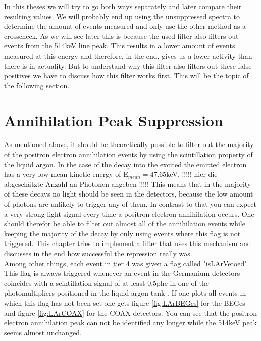 In this theses we will try to go both ways separately and later compare their resulting values.
We will probably end up using the unsuppressed spectra to determine the amount of events measured and only use the other method as a crosscheck.
As we will see later this is because the used filter also filters out events from the 514keV line peak.
This results in a lower amount of events measured at this energy and therefore, in the end, gives us a lower activity than there is in actuality. 
But to understand why this filter also filters out these false positives we have to discuss how this filter works first.
This will be the topic of the following section.
\\

\section{Annihilation Peak Suppression}
\label{sec:APS}

As mentioned above, it should be theoretically possible to filter out the majority of the positron electron annihilation events by using the scintillation property of the liquid argon.
In the case of the \Kr decay into the excited  the emitted electron has a very low mean kinetic energy of E\(_{mean}=47.65\)keV.
!!!!! hier die abgeschätzte Anzahl an Photonen angeben !!!!!
This means that in the majority of these decays no light should be seen in the detectors, because the low amount of photons are unlikely to trigger any of them.
In contrast to that you can expect a very strong light signal every time a positron electron annihilation occurs. 
One should therefor be able to filter out almost all of the annihilation events while keeping the majority of the \Kr decay by only using events where this flag is not triggered.
This chapter tries to implement a filter that uses this mechanism and discusses in the end how successful the repression really was.
\\

Among other things, each event in tier 4 was given a flag called "isLArVetoed".
This flag is always triggered whenever an event in the Germanium detectors coincides with a scintillation signal of at least 0.5phe in one of the photomultipliers positioned in the liquid argon tank \cite{agostini_background_2017}.
If one plots all events in which this flag has not been set one gets figure \ref{fig:LArBEGes} for the BEGes and figure \ref{fig:LArCOAX} for the COAX detectors.
You can see that the positron electron annihilation peak can not be identified any longer while the 514keV peak seems almost unchanged.
\\

